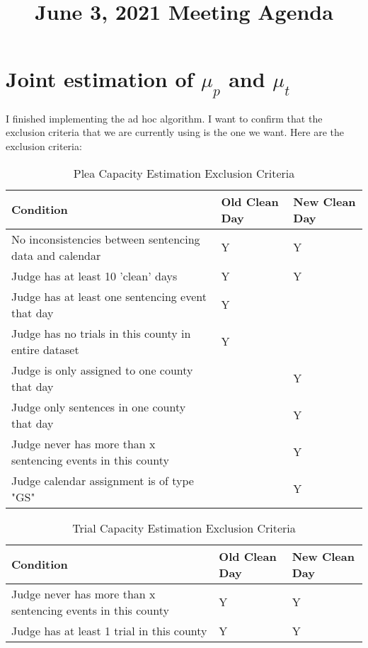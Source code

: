 \documentclass[11pt]{article}
\title{June 3, 2021 Meeting Agenda}
\begin{document}
\maketitle

\section{Joint estimation of $\mu_p$ and $\mu_t$}
I finished implementing the ad hoc algorithm. I want to confirm that the exclusion criteria that
we are currently using is the one we want. Here are the exclusion criteria:

\begin{table}[H]
  \centering
  \caption{Plea Capacity Estimation Exclusion Criteria}
\begin{tabular}{|l|l|l|}
  \hline
\textbf{Condition}                                           & \textbf{Old Clean Day} & \textbf{New Clean Day} \\ \hline
No inconsistencies between sentencing data and calendar & Y & Y \\ \hline
Judge has at least 10 'clean' days                      & Y & Y \\ \hline
Judge has at least one sentencing event that day        & Y &   \\ \hline
Judge has no trials in this county in entire dataset    & Y &   \\ \hline
Judge is only assigned to one county that day           &   & Y \\ \hline
Judge only sentences in one county that day             &   & Y \\ \hline
Judge never has more than x sentencing events in this county &                                 & Y                               \\ \hline
Judge calendar assignment is of type "GS"               &   & Y \\ \hline
\end{tabular}
\end{table}

\begin{table}[H]
\centering
\caption{Trial Capacity Estimation Exclusion Criteria}
\label{tab:my-table}
\begin{tabular}{|l|l|l|}
  \hline
\textbf{Condition}                                           & \textbf{Old Clean Day} & \textbf{New Clean Day} \\ \hline
Judge never has more than x sentencing events in this county & Y                               & Y                               \\ \hline
Judge has at least 1 trial in this county                    & Y                               & Y \\ \hline
\end{tabular}
\end{table}
\end{document}
